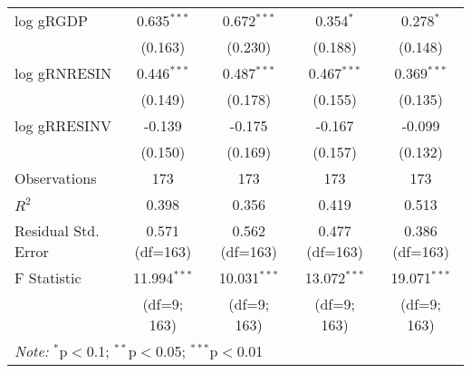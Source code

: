 \begin{table}[H]
\begin{tabular}{@{\extracolsep{5pt}}lcccc}
log gRGDP & 0.635$^{***}$ & 0.672$^{***}$ & 0.354$^{*}$ & 0.278$^{*}$ \\
                & (0.163) & (0.230) & (0.188) & (0.148) \\

log gRNRESIN & 0.446$^{***}$ & 0.487$^{***}$ & 0.467$^{***}$ & 0.369$^{***}$ \\
                   & (0.149) & (0.178) & (0.155) & (0.135) \\

log gRRESINV & -0.139 & -0.175 & -0.167 & -0.099 \\
                   & (0.150) & (0.169) & (0.157) & (0.132) \\

\hline
Observations & 173 & 173 & 173 & 173 \\
$R^2$ & 0.398 & 0.356 & 0.419 & 0.513 \\
Residual Std. Error & 0.571 (df=163) & 0.562 (df=163) & 0.477 (df=163) & 0.386 (df=163) \\
F Statistic & 11.994$^{***}$ & 10.031$^{***}$ & 13.072$^{***}$ & 19.071$^{***}$ \\
            & (df=9; 163) & (df=9; 163) & (df=9; 163) & (df=9; 163) \\
\hline
\hline
\multicolumn{5}{l}{\textit{Note:} $^{*}$p$<$0.1; $^{**}$p$<$0.05; $^{***}$p$<$0.01} \\
\end{tabular}
\end{table}

